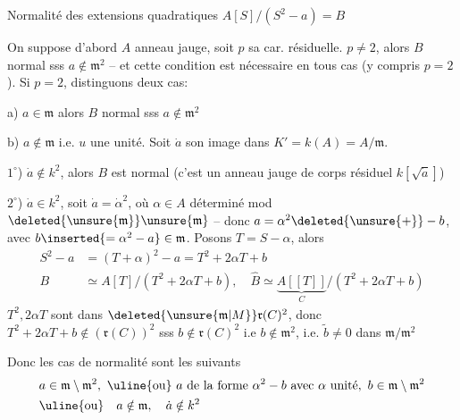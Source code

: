 Normalité des extensions quadratiques \quad $A[S]/(S^2-a)=B$

On suppose d'abord $A$ anneau jauge, soit $p$ sa car. résiduelle.
$p\ne2$, alors $B$ normal sss $a\notin\mathfrak m^2$ -- et cette condition est nécessaire en tous cas (y compris $p=2$). Si $p=2$, distinguons deux cas:

a) $a\in\mathfrak m$ alors $B$ normal sss $a\notin\mathfrak m^2$

b) $a\notin\mathfrak m$ i.e. $u$ une unité. Soit $\dot a$ son image dans $K'=k(A)=A/\mathfrak m$.

$1^\circ$) $\dot a\notin k^2$, alors $B$ est normal (c'est un anneau jauge de corps résiduel $k[\sqrt{\dot a}]$)

$2^\circ$) $\dot a\in k^2$, soit $\dot a=\dot\alpha^2$, où $\alpha\in A$ déterminé mod $\deleted{\unsure{\mathfrak m}}\unsure{\mathfrak m}$ -- donc $a=\alpha^2\deleted{\unsure{+}}-b$, avec $b\inserted{=\alpha^2-a}\in\mathfrak m$. Posons $T=S-\alpha$, alors
\[
\begin{aligned}
S^2-a&=(T+\alpha)^2-a=T^2+2\alpha T+b\\
B&\simeq A[T]/(T^2+2\alpha T+b),\quad
\widehat B\simeq\underbrace{A[[T]]}_{C}/(T^2+2\alpha T+b)
\end{aligned}
\]
$T^2,2\alpha T$ sont dans $\deleted{\unsure{\mathfrak m|M}}\mathfrak r(C)^2$, donc $T^2+2\alpha T+b\notin(\mathfrak r(C))^2$ sss $b\notin\mathfrak r(C)^2$ i.e $b\notin\mathfrak m^2$, i.e. $\widetilde b\ne0$ dans $\mathfrak m/\mathfrak m^2$

Donc les cas de normalité sont les suivants
\[
\begin{aligned}
&a\in\mathfrak m\setminus\mathfrak m^2,\ \text{\uline{ou}}\
a\ \text{de la forme }\alpha^2-b\ \text{avec }\alpha\ \text{unité},\
b\in\mathfrak m\setminus\mathfrak m^2\\
&\text{\uline{ou}}\quad a\notin\mathfrak m,\quad\dot a\notin k^2
\end{aligned}
\]

